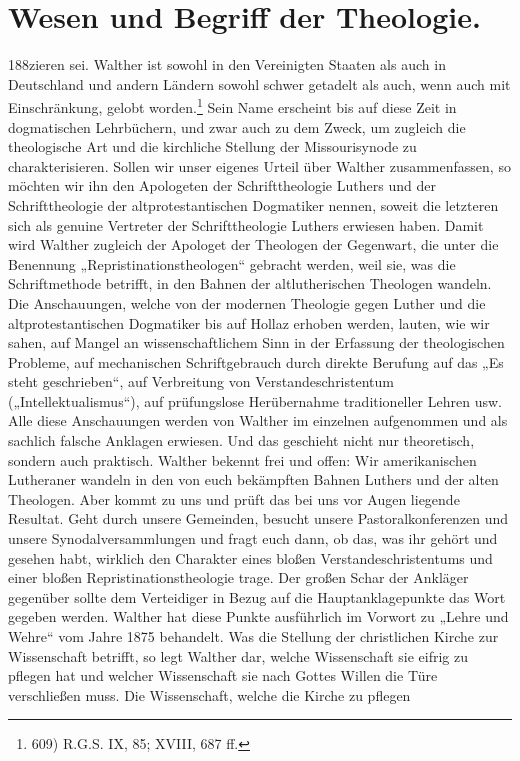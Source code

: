 \section*{Wesen und Begriff der Theologie.}\hfill 188zieren sei. Walther ist sowohl in den Vereinigten Staaten als auch in Deutschland und andern Ländern sowohl schwer getadelt als auch, wenn auch mit Einschränkung, gelobt worden.\footnote{609) \textsc{R.G.S.} IX, 85; XVIII, 687 ff.} Sein Name erscheint bis auf diese Zeit in dogmatischen Lehrbüchern, und zwar auch zu dem Zweck, um zugleich die theologische Art und die kirchliche Stellung der Missourisynode zu charakterisieren. Sollen wir unser eigenes Urteil über Walther zusammenfassen, so möchten wir ihn den Apologeten der Schrifttheologie Luthers und der Schrifttheologie der altprotestantischen Dogmatiker nennen, soweit die letzteren sich als genuine Vertreter der Schrifttheologie Luthers erwiesen haben. Damit wird Walther zugleich der Apologet der Theologen der Gegenwart, die unter die Benennung „Repristinationstheologen“ gebracht werden, weil sie, was die Schriftmethode betrifft, in den Bahnen der altlutherischen Theologen wandeln. Die Anschauungen, welche von der modernen Theologie gegen Luther und die altprotestantischen Dogmatiker bis auf Hollaz erhoben werden, lauten, wie wir sahen, auf Mangel an wissenschaftlichem Sinn in der Erfassung der theologischen Probleme, auf mechanischen Schriftgebrauch durch direkte Berufung auf das „Es steht geschrieben“, auf Verbreitung von Verstandeschristentum („Intellektualismus“), auf prüfungslose Herübernahme traditioneller Lehren usw. Alle diese Anschauungen werden von Walther im einzelnen aufgenommen und als sachlich falsche Anklagen erwiesen. Und das geschieht nicht nur theoretisch, sondern auch praktisch. Walther bekennt frei und offen: Wir amerikanischen Lutheraner wandeln in den von euch bekämpften Bahnen Luthers und der alten Theologen. Aber kommt zu uns und prüft das bei uns vor Augen liegende Resultat. Geht durch unsere Gemeinden, besucht unsere Pastoralkonferenzen und unsere Synodalversammlungen und fragt euch dann, ob das, was ihr gehört und gesehen habt, wirklich den Charakter eines bloßen Verstandeschristentums und einer bloßen Repristinationstheologie trage. Der großen Schar der Ankläger gegenüber sollte dem Verteidiger in Bezug auf die Hauptanklagepunkte das Wort gegeben werden. Walther hat diese Punkte ausführlich im Vorwort zu „Lehre und Wehre“ vom Jahre 1875 behandelt. Was die Stellung der christlichen Kirche zur Wissenschaft betrifft, so legt Walther dar, welche Wissenschaft sie eifrig zu pflegen hat und welcher Wissenschaft sie nach Gottes Willen die Türe verschließen muss. Die Wissenschaft, welche die Kirche zu pflegen